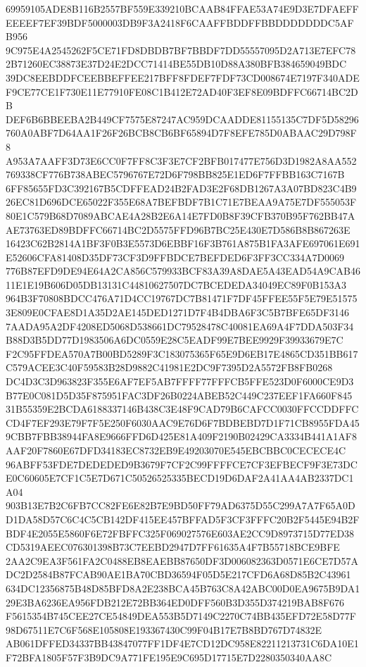 \documentclass[UTF8,fontset=fandol,zihao=-4,a4paper]{ctexart}
\begin{document}
{{69959105ADE8B116B2557BF559E339210BCAAB84FFAE53A74E9D3E7DFAEFFEEEEF7EF39BDF5000003DB9F3A2418F6CAAFFBDDFFBBDDDDDDDC5AFB956
9C975E4A2545262F5CE71FD8DBDB7BF7BBDF7DD55557095D2A713E7EFC782B71260EC38873E37D24E2DCC71414BE55DB10D88A380BFB384659049BDC
39DC8EEBDDFCEEBBEFFEE217BFF8FDEF7FDF73CD008674E7197F340ADEF9CE77CE1F730E11E77910FE08C1B412E72AD40F3EF8E09BDFFC66714BC2DB
DEF6B6BBEEBA2B449CF7575E87247AC959DCAADDE81155135C7DF5D58296760A0ABF7D64AA1F26F26BCB8CB6BF65894D7F8EFE785D0ABAAC29D798F8
A953A7AAFF3D73E6CC0F7FF8C3F3E7CF2BFB017477E756D3D1982A8AA552769338CF776B738ABEC5796767E72D6F798BB825E1ED6F7FFBB163C7167B
6FF85655FD3C392167B5CDFFEAD24B2FAD3E2F68DB1267A3A07BD823C4B926EC81D696DCE65022F355E68A7BEFBDF7B1C71E7BEAA9A75E7DF555053F
80E1C579B68D7089ABCAE4A28B2E6A14E7FD0B8F39CFB370B95F762BB47AAE73763ED89BDFFC66714BC2D5575FFD96B7BC25E430E7D586B8B867263E
16423C62B2814A1BF3F0B3E5573D6EBBF16F3B761A875B1FA3AFE697061E691E52606CFA81408D35DF73CF3D9FFBDCE7BEFDED6F3FF3CC334A7D0069
776B87EFD9DE94E64A2CA856C579933BCF83A39A8DAE5A43EAD54A9CAB4611E1E19B606D05DB13131C44810627507DC7BCEDEDA34049EC89F0B153A3
964B3F70808BDCC476A71D4CC19767DC7B81471F7DF45FFEE55F5E79E515753E809E0CFAE8D1A35D2AE145DED1271D7F4B4DBA6F3C5B7BFE65DF3146
7AADA95A2DF4208ED5068D538661DC79528478C40081EA69A4F7DDA503F34B88D3B5DD77D1983506A6DC0559E28C5EADF99E7BEE9929F39933679E7C
F2C95FFDEA570A7B00BD5289F3C183075365F65E9D6EB17E4865CD351BB617C579ACEE3C40F59583B28D9882C41981E2DC9F7395D2A5572FB8FB0268
DC4D3C3D963823F355E6AF7EF5AB7FFFF77FFFCB5FFE523D0F6000CE9D3B77E0C081D5D35F875951FAC3DF26B0224ABEB52C449C237EEF1FA660F845
31B55359E2BCDA6188337146B438C3E48F9CAD79B6CAFCC0030FFCCDDFFCCD4F7EF293E79F7F5E250F6030AAC9E76D6F7BDBEBD7D1F71CB8955FDA45
9CBB7FBB38944FA8E9666FFD6D425E81A409F2190B02429CA3334B441A1AF8AAF20F7860E67DFD34183EC8732EB9E49203070E545EBCBBC0CECECE4C
96ABFF53FDE7DEDEDED9B3679F7CF2C99FFFFCE7CF3EFBECF9F3E73DCE0C60605E7CF1C5E7D671C50526525335BECD19D6DAF2A41AA4AB2337DC1A04
903B13E7B2C6FB7CC82FE6E82B7E9BD50FF79AD6375D55C299A7A7F65A0DD1DA58D57C6C4C5CB142DF415EE457BFFAD5F3CF3FFFC20B2F5445E94B2F
BDF4E2055E5860F6E72FBFFC325F069027576E603AE2CC9D8973715D77ED38CD5319AEEC076301398B73C7EEBD2947D7FF61635A4F7B55718BCE9BFE
2AA2C9EA3F561FA2C0488EB8EAEBB87650DF3D006082363D0571E6CE7D57ADC2D2584B87FCAB90AE1BA70CBD36594F05D5E217CFD6A68D85B2C43961
634DC12356875B48D85BFD8A2E238BCA45B763C8A42ABC00D0EA9675B9DA129E3BA6236EA956FDB212E72BB364ED0DFF560B3D355D374219BAB8F676
F5615354B745CEE27CE54849DEA553B5D7149C2270C74BB435EFD72E58D77F98D67511E7C6F568E105808E193367430C99F04B17E7B8BD767D74832E
AB061DFFED34337BB43847077FF1DF4E7CD12DC958E82211213731C6DA10E1F72BFA1805F57F3B9DC9A771FE195E9C695D17715E7D2280350340AA8C
}}
\end{document}
